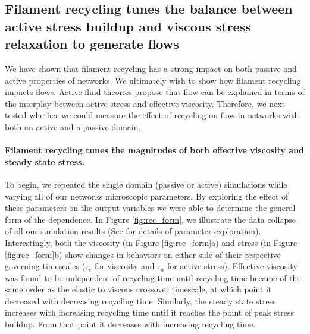 \documentclass[10pt,letterpaper]{article}
\begin{document}
\subsection*{Filament recycling tunes the balance between active stress buildup and viscous stress relaxation to generate flows}
We have shown that filament recycling has a strong impact on both passive and active properties of networks.  We ultimately wish to show how filament recycling impacts flows.  Active fluid theories propose that flow can be explained in terms of the interplay between active stress and effective viscosity. Therefore, we next tested whether we could measure the effect of recycling on flow in networks with both an active and a passive domain.
 

\paragraph{Filament recycling tunes the magnitudes of both effective viscosity and steady state stress.}  
To begin, we repeated the single domain (passive or active) simulations while varying all of our networks microscopic parameters.   By exploring the effect of these parameters on the output variables we were able to determine the general form of the dependence. In Figure \ref{fig:rec_form}, we illustrate the data collapse of all our simulation results (See  for details of parameter exploration).  Interestingly, both the viscosity (in Figure \ref{fig:rec_form}a) and stress (in Figure \ref{fig:rec_form}b) show changes in behaviors on either side of their respective governing timescales ($\tau_c$ for viscosity and $\tau_a$ for active stress).  Effective viscosity was found to be independent of recycling time until recycling time became of the same order as the elastic to viscous crossover timescale, at which point it decreased with decreasing recycling time.  Similarly, the steady state stress increases with increasing recycling time until it reaches the point of peak stress buildup.  From that point it decreases with increasing recycling time.
\end{document}
